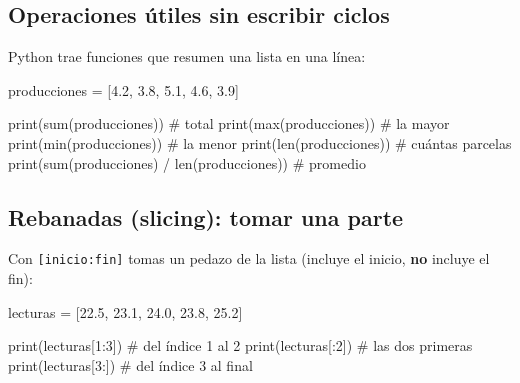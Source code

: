 \documentclass[
  spanish,
  letterpaper,
  DIV=11,
  numbers=noendperiod]{scrreprt}
\newenvironment{Shaded}{\begin{snugshade}}{\end{snugshade}}
\newcommand{\BuiltInTok}[1]{\textcolor[rgb]{0.00,0.23,0.31}{#1}}
\newcommand{\CommentTok}[1]{\textcolor[rgb]{0.37,0.37,0.37}{#1}}
\newcommand{\DecValTok}[1]{\textcolor[rgb]{0.68,0.00,0.00}{#1}}
\newcommand{\FloatTok}[1]{\textcolor[rgb]{0.68,0.00,0.00}{#1}}
\newcommand{\NormalTok}[1]{\textcolor[rgb]{0.00,0.23,0.31}{#1}}
\newcommand{\OperatorTok}[1]{\textcolor[rgb]{0.37,0.37,0.37}{#1}}
\begin{document}
\subsection{Operaciones útiles sin escribir
ciclos}\label{operaciones-uxfatiles-sin-escribir-ciclos}

Python trae funciones que resumen una lista en una línea:

\begin{Shaded}
\begin{Highlighting}[]
\NormalTok{producciones }\OperatorTok{=}\NormalTok{ [}\FloatTok{4.2}\NormalTok{, }\FloatTok{3.8}\NormalTok{, }\FloatTok{5.1}\NormalTok{, }\FloatTok{4.6}\NormalTok{, }\FloatTok{3.9}\NormalTok{]}

\BuiltInTok{print}\NormalTok{(}\BuiltInTok{sum}\NormalTok{(producciones))   }\CommentTok{\# total}
\BuiltInTok{print}\NormalTok{(}\BuiltInTok{max}\NormalTok{(producciones))   }\CommentTok{\# la mayor}
\BuiltInTok{print}\NormalTok{(}\BuiltInTok{min}\NormalTok{(producciones))   }\CommentTok{\# la menor}
\BuiltInTok{print}\NormalTok{(}\BuiltInTok{len}\NormalTok{(producciones))   }\CommentTok{\# cuántas parcelas}
\BuiltInTok{print}\NormalTok{(}\BuiltInTok{sum}\NormalTok{(producciones) }\OperatorTok{/} \BuiltInTok{len}\NormalTok{(producciones))  }\CommentTok{\# promedio}
\end{Highlighting}
\end{Shaded}

\subsection{Rebanadas (slicing): tomar una
parte}\label{rebanadas-slicing-tomar-una-parte}

Con \texttt{{[}inicio:fin{]}} tomas un pedazo de la lista (incluye el
inicio, \textbf{no} incluye el fin):

\begin{Shaded}
\begin{Highlighting}[]
\NormalTok{lecturas }\OperatorTok{=}\NormalTok{ [}\FloatTok{22.5}\NormalTok{, }\FloatTok{23.1}\NormalTok{, }\FloatTok{24.0}\NormalTok{, }\FloatTok{23.8}\NormalTok{, }\FloatTok{25.2}\NormalTok{]}

\BuiltInTok{print}\NormalTok{(lecturas[}\DecValTok{1}\NormalTok{:}\DecValTok{3}\NormalTok{])   }\CommentTok{\# del índice 1 al 2}
\BuiltInTok{print}\NormalTok{(lecturas[:}\DecValTok{2}\NormalTok{])    }\CommentTok{\# las dos primeras}
\BuiltInTok{print}\NormalTok{(lecturas[}\DecValTok{3}\NormalTok{:])    }\CommentTok{\# del índice 3 al final}
\end{Highlighting}
\end{Shaded}
\end{document}
